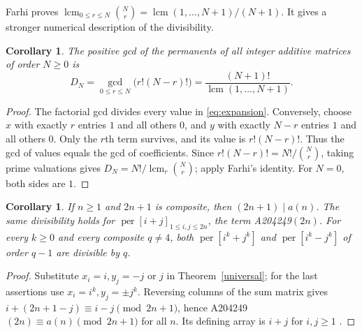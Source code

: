 \documentclass[11pt]{article}
\newcommand{\per}{\operatorname{per}}
\newcommand{\lcm}{\operatorname{lcm}}
\newtheorem{corollary}[theorem]{Corollary}
\begin{document}
Farhi \cite[Theorem 1, p.~2]{farhi} proves
$\lcm_{0\le r\le N}\binom Nr=\lcm(1,\ldots,N+1)/(N+1)$.
It gives a stronger numerical description of the divisibility.
\begin{corollary}\label{gcd}
The positive gcd of the permanents of all integer additive matrices
of order $N\ge0$ is
\begin{equation}\label{eq:gcd}
 D_N=\gcd_{0\le r\le N}\bigl(r!(N-r)!\bigr)
     =\frac{(N+1)!}{\lcm(1,\ldots,N+1)}.
\end{equation}
\end{corollary}
\begin{proof}
The factorial gcd divides every value in \eqref{eq:expansion}.
Conversely, choose $x$ with exactly $r$ entries $1$ and all others $0$,
and $y$ with exactly $N-r$ entries $1$ and all others $0$.
Only the $r$th term survives, and its value is $r!(N-r)!$.
Thus the gcd of values equals the gcd of coefficients.
Since $r!(N-r)!=N!/\binom Nr$, taking prime valuations gives
$D_N=N!/\lcm_r\binom Nr$; apply Farhi's identity.
For $N=0$, both sides are $1$.
\end{proof}

\begin{corollary}\label{suncomposite}
If $n\ge1$ and $2n+1$ is composite, then $(2n+1)\mid a(n)$.
The same divisibility holds for $\per[i+j]_{1\le i,j\le2n}$,
the term A204249$(2n)$. For every $k\ge0$ and every composite
$q\ne4$, both $\per[i^k+j^k]$ and $\per[i^k-j^k]$ of order
$q-1$ are divisible by $q$.
\end{corollary}
\begin{proof}
Substitute $x_i=i,y_j=-j$ or $j$ in Theorem~\ref{universal};
for the last assertions use $x_i=i^k,y_j=\pm j^k$.
Reversing columns of the sum matrix gives
$i+(2n+1-j)\equiv i-j\pmod{2n+1}$, hence
A204249$(2n)\equiv a(n)\pmod{2n+1}$ for all $n$.
Its defining array is $i+j$ for $i,j\ge1$ \cite{sum,array}.
\end{proof}
\end{document}

